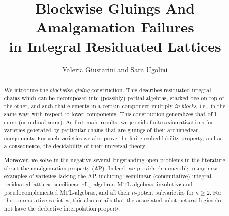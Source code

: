 \documentclass{amsart}
\theoremstyle{definition}
\numberwithin{equation}{section}
\begin{document}
 
\title[Blockwise Gluings And Amalgamation Failures in IRLs]{Blockwise Gluings And Amalgamation Failures\\ in Integral Residuated Lattices}

\author{Valeria Giustarini and Sara Ugolini}
\address{Artificial Intelligence Research Institute (IIIA), CSIC, Barcelona, Spain}


\begin{abstract}
We introduce the {\em blockwise gluing} construction. This describes residuated integral chains which can be decomposed into (possibly) partial algebras, stacked one on top of the other, and such that elements in a certain component multiply {\em in blocks}, i.e., in the same way, with respect to lower components. This construction generalizes that of 1-sums (or ordinal sums). As first main results, we provide finite axiomatizations for varieties generated by particular chains that are gluings of their archimedean components. For such varieties we also prove the finite embeddability property, and as a consequence, the decidability of their universal theory.

Moreover, we solve in the negative several longstanding open problems in the literature about the amalgamation property (AP). Indeed, we provide denumerably many new examples of varieties lacking the AP, including: semilinear (commutative) integral residuated lattices, semilinear FL$_w$-algebras, MTL-algebras, involutive and pseudocomplemented MTL-algebras, and all their $n$-potent subvarieties for $n\geq 2$. For the commutative varieties, this also entails that the associated substructural logics do not have the deductive interpolation property.
\end{abstract}
\maketitle
\end{document}
